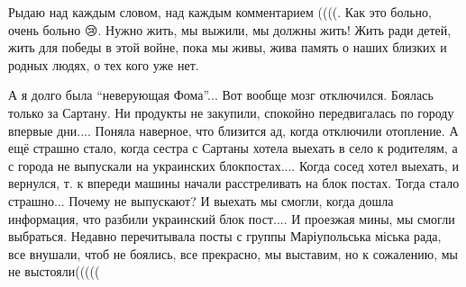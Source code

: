 Рыдаю над каждым словом, над каждым комментарием ((((. Как это больно, очень
больно 😢. Нужно жить, мы выжили, мы должны жить! Жить ради детей, жить для
победы в этой войне, пока мы живы, жива память о наших близких и родных людях,
о тех кого уже нет.


А я долго была \enquote{неверующая Фома}... Вот вообще мозг отключился. Боялась только
за Сартану. Ни продукты не закупили, спокойно передвигалась по городу впервые
дни.... Поняла наверное, что близится ад, когда отключили отопление. А ещё
страшно стало, когда сестра с Сартаны хотела выехать в село к родителям, а с
города не выпускали на украинских блокпостах.... Когда сосед хотел выехать, и
вернулся, т. к впереди машины начали расстреливать на блок постах. Тогда стало
страшно... Почему не выпускают? И выехать мы смогли, когда дошла информация, что
разбили украинский блок пост.... И проезжая мины, мы смогли выбраться. Недавно
перечитывала посты с группы Маріупольська міська рада, все внушали, чтоб не
боялись, все прекрасно, мы выставим, но к сожалению, мы не выстояли(((((

